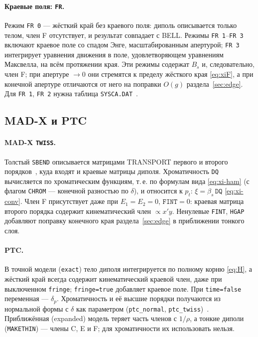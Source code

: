 \paragraph{Краевые поля: \texttt{FR}.}
Режим \texttt{FR 0} --- жёсткий край без краевого поля: диполь описывается только телом, член F отсутствует, и результат совпадает с BELL. Режимы \texttt{FR 1}--\texttt{FR 3} включают краевое поле со спадом Энге, масштабированным апертурой; \texttt{FR 3} интегрирует уравнения движения в поле, удовлетворяющем уравнениям Максвелла, на всём протяжении края. Эти режимы содержат $B_s$ и, следовательно, член F; при апертуре $\to0$ они стремятся к пределу жёсткого края \eqref{eq:xiF}, а при конечной апертуре отличаются от него на поправки $O(g)$ раздела~\ref{sec:edge}. Для \texttt{FR 1}, \texttt{FR 2} нужна таблица \texttt{SYSCA.DAT}~\cite{COSYManual}.

\subsection{MAD-X и PTC}

\paragraph{MAD-X \texttt{TWISS}.}
Толстый \texttt{SBEND} описывается матрицами TRANSPORT первого и второго порядков~\cite{Brown1968,MADX}, куда входят и краевые матрицы диполя. Хроматичность \texttt{DQ} вычисляется по хроматическим функциям, т.\,е. по формулам вида \eqref{eq:xi-ham} (с флагом \texttt{CHROM} --- конечной разностью по $\delta$), и относится к $p_t$: $\xi=\beta_s\,\mathtt{DQ}$ \eqref{eq:xi-conv}. Член F присутствует даже при $E_1=E_2=0$, $\mathtt{FINT}=0$: краевая матрица второго порядка содержит кинематический член $\propto x'y$. Ненулевые \texttt{FINT}, \texttt{HGAP} добавляют поправку конечного края раздела~\ref{sec:edge} в приближении тонкого слоя.

\paragraph{PTC.}
В точной модели (\texttt{exact}) тело диполя интегрируется по полному корню \eqref{eq:H}, а жёсткий край всегда содержит кинематический краевой член, даже при выключенном \texttt{fringe}; \texttt{fringe=true} добавляет краевое поле. При \texttt{time=false} переменная --- $\delta_p$. Хроматичность и её высшие порядки получаются из нормальной формы с $\delta$ как параметром (\texttt{ptc\_normal}, \texttt{ptc\_twiss})~\cite{PTC}. Приближённая (expanded) модель теряет часть членов с $1/\rho$, а тонкие диполи (\texttt{MAKETHIN}) --- члены C, E и F; для хроматичности их использовать нельзя.

